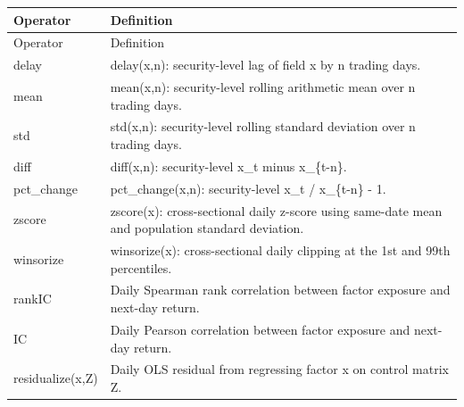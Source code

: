 \scriptsize
\setlength{\tabcolsep}{2pt}
\begin{longtable}{p{}p{}}
\toprule
Operator & Definition \\
\midrule
\endfirsthead
\toprule
Operator & Definition \\
\midrule
\endhead
delay & delay(x,n): security-level lag of field x by n trading days. \\
mean & mean(x,n): security-level rolling arithmetic mean over n trading days. \\
std & std(x,n): security-level rolling standard deviation over n trading days. \\
diff & diff(x,n): security-level x\_t minus x\_\{t-n\}. \\
pct\_change & pct\_change(x,n): security-level x\_t / x\_\{t-n\} - 1. \\
zscore & zscore(x): cross-sectional daily z-score using same-date mean and population standard deviation. \\
winsorize & winsorize(x): cross-sectional daily clipping at the 1st and 99th percentiles. \\
rankIC & Daily Spearman rank correlation between factor exposure and next-day return. \\
IC & Daily Pearson correlation between factor exposure and next-day return. \\
residualize(x,Z) & Daily OLS residual from regressing factor x on control matrix Z. \\
\bottomrule
\end{longtable}
\normalsize

